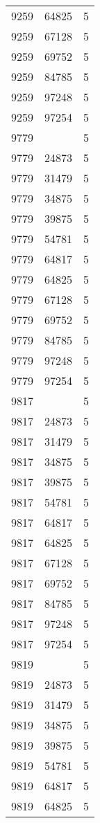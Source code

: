 {{\begin{tabular}{|c|c||c|}
9259&64825&5\\ 9259&67128&5\\ 9259&69752&5\\ 9259&84785&5\\ 9259&97248&5\\ 9259&97254&5\\ 9779& &5\\ 9779&24873&5\\ 9779&31479&5\\ 9779&34875&5\\ 9779&39875&5\\ 9779&54781&5\\ 9779&64817&5\\ 9779&64825&5\\ 9779&67128&5\\ 9779&69752&5\\ 9779&84785&5\\ 9779&97248&5\\ 9779&97254&5\\ 9817& &5\\ 9817&24873&5\\ 9817&31479&5\\ 9817&34875&5\\ 9817&39875&5\\ 9817&54781&5\\ 9817&64817&5\\ 9817&64825&5\\ 9817&67128&5\\ 9817&69752&5\\ 9817&84785&5\\ 9817&97248&5\\ 9817&97254&5\\ 9819& &5\\ 9819&24873&5\\ 9819&31479&5\\ 9819&34875&5\\ 9819&39875&5\\ 9819&54781&5\\ 9819&64817&5\\ 9819&64825&5\\ 
        \hline
        \end{tabular}
    }
}

